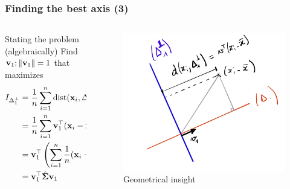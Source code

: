 \documentclass{beamer}\usepackage[]{graphicx}\usepackage[]{color}
\begin{document}
\begin{frame}
  \frametitle{Finding the best axis (3)}

\begin{columns}
  \begin{column}{.5\textwidth}
  \begin{block}{Stating the problem (algebraically)}
    Find $\mathbf{v}_1; \|\mathbf{v}_1 \|=1$ that maximizes
    \begin{equation*}
      \begin{aligned}
        I_{\Delta_1^\bot} & = \frac{1}{n}\sum_{i=1}^n \text{dist}(\mathbf{x}_i,\Delta_1^\bot)^2 \\ 
        & = \frac{1}{n}\sum_{i=1}^n \mathbf{v}_1^\top (\mathbf{x}_i - \bar{\mathbf{x}})(\mathbf{x}_i - \bar{\mathbf{x}})^\top \mathbf{v}_1 \\
        & = \mathbf{v}_1^\top \left( \sum_{i=1}^n \frac{1}{n}(\mathbf{x}_i - \bar{\mathbf{x}})(\mathbf{x}_i - \bar{\mathbf{x}})^\top \right)  \mathbf{v}_1 \\
        & = \mathbf{v}_1^\top \hat{\boldsymbol{\Sigma}}  \mathbf{v}_1
      \end{aligned}
    \end{equation*} 
  \end{block}  
  \end{column}
  \begin{column}{.45\textwidth}
  \begin{figure}
    \includegraphics[width=.9\textwidth]{solving_inertia}
    \caption{Geometrical insight}
  \end{figure}
  \end{column}
\end{columns}
  
\end{frame}
\end{document}
